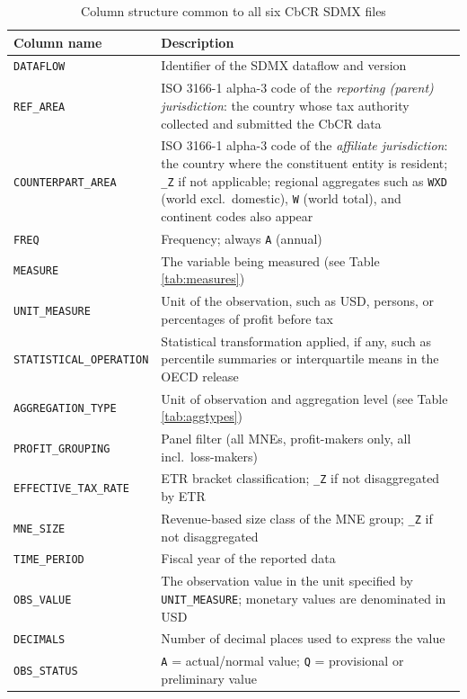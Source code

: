\documentclass[11pt,a4paper]{article}
\newcommand{\code}[1]{\texttt{#1}}
\begin{document}
\begin{table}[H]
\centering
\caption{Column structure common to all six CbCR SDMX files}
\label{tab:columns}
\begin{tabular}{@{}lp{9.5cm}@{}}
\toprule
Column name & Description \\
\midrule
\code{DATAFLOW} & Identifier of the SDMX dataflow and version \\
\code{REF\_AREA} & ISO 3166-1 alpha-3 code of the \emph{reporting (parent) jurisdiction}: the country whose tax authority collected and submitted the CbCR data \\
\code{COUNTERPART\_AREA} & ISO 3166-1 alpha-3 code of the \emph{affiliate jurisdiction}: the country where the constituent entity is resident; \code{\_Z} if not applicable; regional aggregates such as \code{WXD} (world excl.\ domestic), \code{W} (world total), and continent codes also appear \\
\code{FREQ} & Frequency; always \code{A} (annual) \\
\code{MEASURE} & The variable being measured (see Table \ref{tab:measures}) \\
\code{UNIT\_MEASURE} & Unit of the observation, such as USD, persons, or percentages of profit before tax \\
\code{STATISTICAL\_OPERATION} & Statistical transformation applied, if any, such as percentile summaries or interquartile means in the OECD release \\
\code{AGGREGATION\_TYPE} & Unit of observation and aggregation level (see Table \ref{tab:aggtypes}) \\
\code{PROFIT\_GROUPING} & Panel filter (all MNEs, profit-makers only, all incl.\ loss-makers) \\
\code{EFFECTIVE\_TAX\_RATE} & ETR bracket classification; \code{\_Z} if not disaggregated by ETR \\
\code{MNE\_SIZE} & Revenue-based size class of the MNE group; \code{\_Z} if not disaggregated \\
\code{TIME\_PERIOD} & Fiscal year of the reported data \\
\code{OBS\_VALUE} & The observation value in the unit specified by \code{UNIT\_MEASURE}; monetary values are denominated in USD \\
\code{DECIMALS} & Number of decimal places used to express the value \\
\code{OBS\_STATUS} & \code{A} = actual/normal value; \code{Q} = provisional or preliminary value \\
\bottomrule
\end{tabular}
\end{table}
\end{document}

